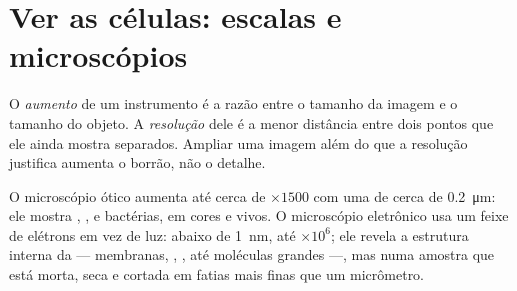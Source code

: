 \section{Ver as células: escalas e microscópios}

\begin{definition}\label{def:g10:cells-common-unit:magnification}
O \emph{aumento} de um instrumento é a razão entre o
tamanho da imagem e o tamanho do objeto. A
\emph{resolução} dele é a menor distância entre dois
pontos que ele ainda mostra separados. Ampliar uma imagem além do que a
resolução justifica aumenta o borrão, não o detalhe.
\end{definition}

\begin{proposition}\label{prop:g10:cells-common-unit:microscopes}
O microscópio ótico aumenta até cerca de $\times 1500$ com uma
 de cerca de \qty{0.2}{\micro m}: ele mostra , ,
 e bactérias, em cores e vivos. O microscópio eletrônico
usa um feixe de elétrons em vez de luz:  abaixo de
\qty{1}{nm},  até $\times 10^6$; ele revela a estrutura interna
da  --- membranas, , , até moléculas
grandes ---, mas numa amostra que está morta, seca e cortada em fatias
mais finas que um micrômetro.
\end{proposition}
\admitted

